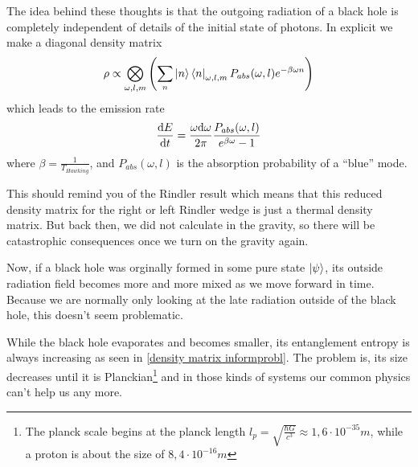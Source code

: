 	The idea behind these thoughts is that the outgoing radiation of a black hole is completely independent of details of the initial state of photons. 
	In explicit we make a diagonal density matrix
		\begin{equation} \label{density matrix informprobl}
			\rho \propto \bigotimes_{\omega, l, m} \left(
			\sum_n \ket{n} \bra{n}_{\omega, l, m} P_{abs} (\omega, l) e^{-\beta \omega n}
			\right)
		\end{equation}
	which leads to the emission rate 
		\begin{equation}
			\frac{\mathrm{d} E}{\mathrm{d} t} = 
			\frac{\omega \mathrm{d} \omega}{2\pi} 
			\frac{P_{abs}(\omega, l)}{e^{\beta \omega}-1}
		\end{equation}
	where $\beta = \frac{1}{T_{Hawking}}$, and $P_{abs}(\omega, l)$ is the absorption
	probability of a ``blue'' mode.
		
	This should remind you of the Rindler result which means that this reduced density matrix for the right or left Rindler wedge is just a thermal density matrix. But back then, we did not calculate in the gravity, so there will be catastrophic consequences once we turn on the gravity again.
		
	Now, if a black hole was orginally formed in some pure state $\ket{\psi}$, its outside radiation field becomes more and more mixed as we move forward in time. Because we are normally only looking at the late radiation outside of the black hole, this doesn't seem problematic. 
		
	While the black hole evaporates and becomes smaller, its entanglement entropy is always increasing as seen in \eqref{density matrix informprobl}. The problem is, its size decreases until it is Planckian\footnote{The planck scale begins at the planck length $l_p = \sqrt{\frac{\hbar G}{c^3}} \approx 1,6 \cdot 10^{-35}\unit{m}$, while a proton is about the size of $8,4 \cdot 10^{-16}\unit{m}$} and in those kinds of systems our common physics can't help us any more.
	
